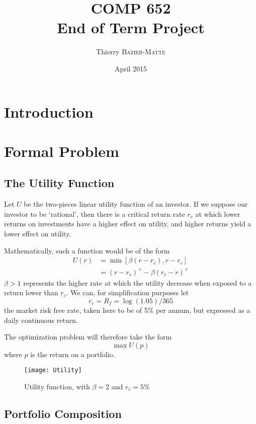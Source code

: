 \documentclass[11pt,fleqn]{article}
\title{COMP 652 \\ End of Term Project}
\author{Thierry \textsc{Bazier-Matte}}
\date{April 2015}
\begin{document}
\maketitle

\section{Introduction}

\section{Formal Problem}

\subsection{The Utility Function}

Let $U$ be the two-pieces linear utility function of an investor. If we suppose our investor
to be `rational', then there is a critical return rate $r_c$ at which lower returns on
investments have a higher effect on utility, and higher returns yield a lower effect on
utility. 

Mathematically, such a function would be of the form 
\begin{align*}
  U(r) &= \min[\beta(r-r_c), r-r_c]\\
       &= (r-r_c)^+ - \beta(r_c - r)^+
\end{align*}
$\beta>1$ represents the higher rate at which the utility decrease when exposed to a
return lower than $r_c$. We can, for simplification purposes let
\begin{equation*}
  r_c = R_f = \log(1.05)/365
\end{equation*}
the market risk free rate, taken here to be of 5\% per annum, but expressed as a daily
continuous return.

The optimization problem will therefore take the form
\begin{equation*}
  \max U(p)
\end{equation*}
where $p$ is the return on a portfolio.

\begin{figure}
  \centering
  \texttt{[image: Utility]}
  \caption{Utility function, with $\beta=2$ and $r_c=5\%$}
  \label{fig:utility}
\end{figure}

\subsection{Portfolio Composition}
\end{document}
